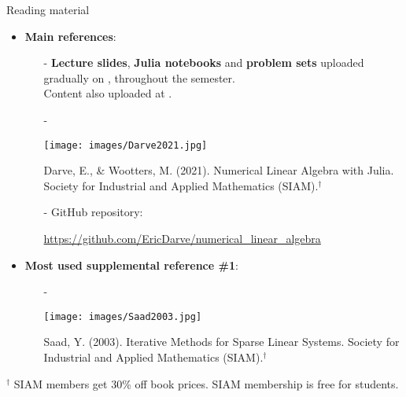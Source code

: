 \documentclass[t,usepdftitle=false]{beamer}
\begin{document}
\begin{frame}{Reading material}
\begin{itemize}
\item \textbf{Main references}:
\begin{itemize}
\item[-] \textbf{Lecture slides}, \textbf{Julia notebooks} and \textbf{problem sets} uploaded gradually on \href{https://www.moodle.tum.de/}{}, throughout the semester.\\
Content also uploaded at \href{https://venkovic.github.io/NLA-for-CS-and-IE}{}.
\item[-]\begin{minipage}{0.2\textwidth}\vspace{.15cm}
\texttt{[image: images/Darve2021.jpg]}
\end{minipage}
\hspace{-.8cm}
\begin{minipage}{0.75\textwidth}
Darve, E., \& Wootters, M. (2021). Numerical Linear Algebra with Julia.
Society for Industrial and Applied Mathematics (SIAM).${}^\dagger$
\end{minipage}\vspace{.3cm}
\item[-] GitHub repository: 
\begin{center}\url{https://github.com/EricDarve/numerical_linear_algebra}\end{center}\vspace{.3cm}
\end{itemize}
\item \textbf{Most used supplemental reference \#1}:
\begin{itemize}
\item[-]\begin{minipage}{0.2\textwidth}\vspace{.15cm}
\texttt{[image: images/Saad2003.jpg]}
\end{minipage}
\hspace{-.8cm}
\begin{minipage}{0.75\textwidth}
Saad, Y. (2003). Iterative Methods for Sparse Linear Systems. 
Society for Industrial and Applied Mathematics (SIAM).${}^\dagger$
\end{minipage}\vspace{.3cm}
\end{itemize}
\end{itemize}
\vfill
\tiny{${}^\dagger$ SIAM members get 30\% off book prices. SIAM membership is free for students.}
\end{frame}
\end{document}
